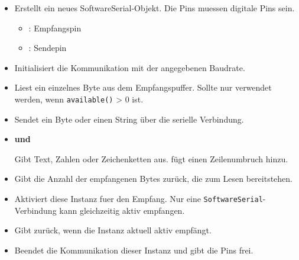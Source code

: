 \begin{itemize}
	\item\textbf{}

Erstellt ein neues SoftwareSerial-Objekt. Die Pins muessen digitale Pins sein.

\begin{itemize}
	\item {}: Empfangspin
	\item {}: Sendepin
\end{itemize}

\item \textbf{}

Initialisiert die Kommunikation mit der angegebenen Baudrate.

\item \textbf{}

Liest ein einzelnes Byte aus dem Empfangspuffer. Sollte nur verwendet werden, wenn \texttt{available()} > 0 ist.

\item \textbf{}

Sendet ein Byte oder einen String über die serielle Verbindung.

\item \textbf{ und }

Gibt Text, Zahlen oder Zeichenketten aus.  fügt einen Zeilenumbruch hinzu.

\item \textbf{}

Gibt die Anzahl der empfangenen Bytes zurück, die zum Lesen bereitstehen.

\item \textbf{}

Aktiviert diese Instanz fuer den Empfang. Nur eine \texttt{SoftwareSerial}-Verbindung kann gleichzeitig aktiv empfangen.

\item \textbf{}

Gibt  zurück, wenn die Instanz aktuell aktiv empfängt.

\item \textbf{}


Beendet die Kommunikation dieser Instanz und gibt die Pins frei. \cite{Arduino:2022SoftwareSerial}
\end{itemize}


